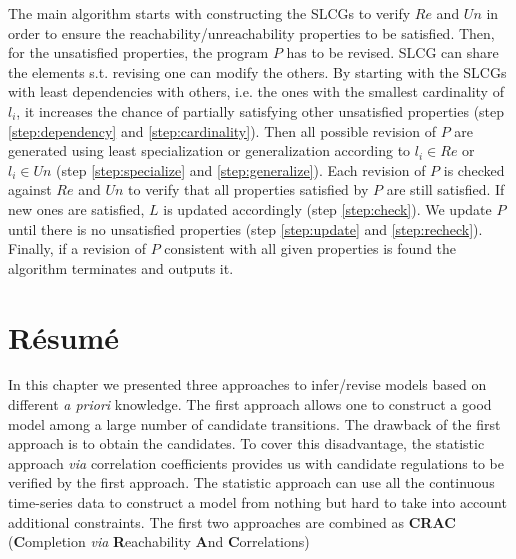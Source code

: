       
    The main algorithm starts with constructing the SLCGs to verify $Re$ and $Un$ in order to ensure the reachability/unreachability properties to be satisfied.
    Then, for the unsatisfied properties, the program $P$ has to be revised.
    SLCG can share the elements s.t. revising one can modify the others.
    By starting with the SLCGs with least dependencies with others, i.e. the ones with the smallest cardinality of $l_i$, it increases the chance of partially satisfying other unsatisfied properties (step \ref{step:dependency} and \ref{step:cardinality}). 
    Then all possible revision of $P$ are generated using least specialization or generalization according to $l_i\in Re$ or $l_i \in Un$ (step \ref{step:specialize} and \ref{step:generalize}). 
    Each revision of $P$ is checked against $Re$ and $Un$ to verify that all properties satisfied by $P$ are still satisfied. 
    If new ones are satisfied, $L$ is updated accordingly (step \ref{step:check}).
    We update $P$ until there is no unsatisfied properties (step \ref{step:update} and \ref{step:recheck}).
    Finally, if a revision of $P$ consistent with all given properties is found the algorithm terminates and outputs it.
    
\section{R\'esum\'e}
In this chapter we presented three approaches to infer/revise models based on different \textit{a priori} knowledge.
The first approach allows one to construct a good model among a large number of candidate transitions.
The drawback of the first approach is to obtain the candidates.
To cover this disadvantage, the statistic approach \textit{via} correlation coefficients provides us with candidate regulations to be verified by the first approach.
The statistic approach can use all the continuous time-series data to construct a model from nothing but hard to take into account additional constraints.
The first two approaches are combined as \textbf{CRAC} (\textbf{C}ompletion \textit{via} \textbf{R}eachability \textbf{A}nd \textbf{C}orrelations)


